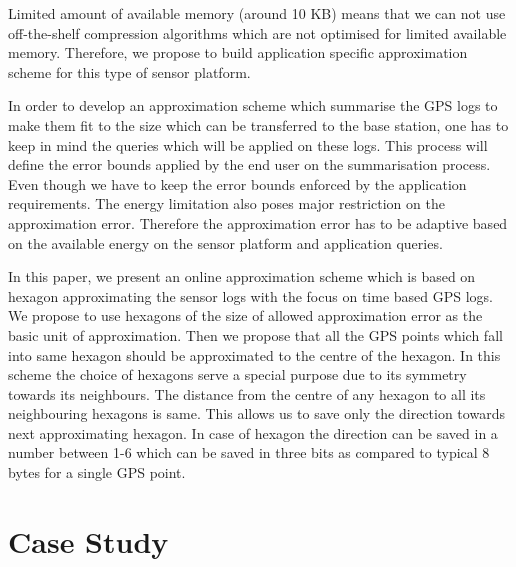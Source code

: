 \documentclass[conference]{IEEEtran}
\begin{document}

Limited amount of available memory (around 10 KB) means that we can not use off-the-shelf compression algorithms which are not optimised for limited available memory. Therefore, we propose to build application specific approximation scheme for this type of sensor platform.\

In order to develop an approximation scheme which summarise the GPS logs to make them fit to the size which can be transferred to the base station, one has to keep in mind the queries which will be applied on these logs. This process will define the error bounds applied by the end user on the summarisation process. Even though we have to keep the error bounds enforced by the application requirements. The energy limitation also poses major restriction on the approximation error. Therefore the approximation error has to be adaptive based on the available energy on the sensor platform and application queries.

In this paper, we present an online approximation scheme which is based on hexagon approximating the sensor logs with the focus on time based GPS logs. We propose to use hexagons of the size of allowed approximation error as the basic unit of approximation. Then we propose that all the GPS points which fall into same hexagon should be approximated to the centre of the hexagon. In this scheme the choice of hexagons serve a special purpose due to its symmetry towards its neighbours. The distance from the centre of any hexagon to all its neighbouring hexagons is same. This allows us to save only the direction towards next approximating hexagon. In case of hexagon the direction can be saved in a number between 1-6 which can be saved in three bits as compared to typical 8 bytes for a single GPS point.

\section{Case Study}
\end{document}
